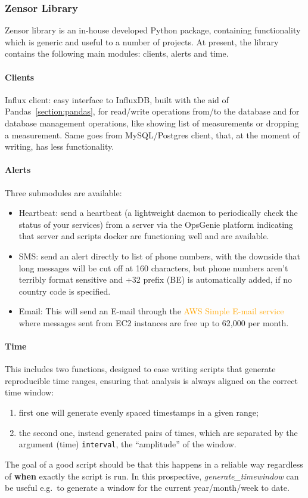 \subsubsection{Zensor Library}
Zensor library is an in-house developed Python package, containing functionality which is generic and useful to a number of projects. At present, the library contains the following main modules: 
clients, alerts and time.
\paragraph{Clients}
Influx client: easy interface to InfluxDB, built with the aid of Pandas~\ref{section:pandas}, for read/write operations from/to the database and for database management operations, like showing list of measurements or dropping a measurement.
Same goes from MySQL/Postgres client, that, at the moment of writing, has less functionality.
\paragraph{Alerts}
Three submodules are available:
\begin{itemize}
	\item Heartbeat: send a heartbeat (a lightweight daemon to periodically check the status of your services) from a server via the OpsGenie platform indicating that server and scripts docker are functioning well and are available.
	\item SMS: send an alert directly to list of phone numbers, with the downside that long messages will be cut off at 160 characters, but phone numbers aren't terribly format sensitive 
	and +32 prefix (BE) is automatically added, if no country code is specified.
	\item Email: This will send an E-mail through the \textcolor{orange}{AWS Simple E-mail service} where messages sent from EC2 instances are free up to 62,000 per month.
\end{itemize}
\paragraph{Time}
This includes two functions, designed to ease writing scripts that generate reproducible time ranges, ensuring that analysis is always aligned on the correct time window:
\begin{enumerate}
	\item first one will generate evenly spaced timestamps in a given range;
	\item the second one, instead generated pairs of times, which are separated by the argument (time) \texttt{interval}, the ``amplitude'' of the window.
\end{enumerate}
The goal of a good script should be that this happens in a reliable way regardless of \textbf{when} exactly the script is run.
In this prospective, \textit{generate\_timewindow} can be useful e.g.\ to generate a window for the current year/month/week to date.

